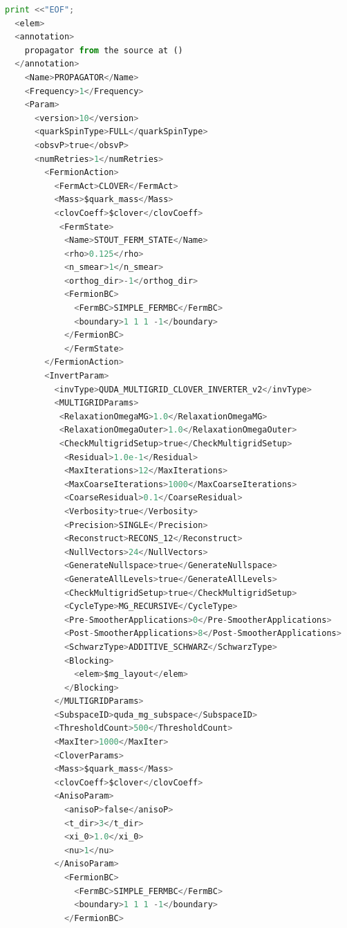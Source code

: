 \documentclass{article}
\begin{document}
\begin{lstlisting}[language=Python]
  print <<"EOF";
  <elem>
  <annotation>
    propagator from the source at ()
  </annotation>      
    <Name>PROPAGATOR</Name>
    <Frequency>1</Frequency>
    <Param>
      <version>10</version>
      <quarkSpinType>FULL</quarkSpinType>
      <obsvP>true</obsvP>
      <numRetries>1</numRetries>
        <FermionAction>
          <FermAct>CLOVER</FermAct>
          <Mass>$quark_mass</Mass>
          <clovCoeff>$clover</clovCoeff>
           <FermState>
            <Name>STOUT_FERM_STATE</Name>
            <rho>0.125</rho>
            <n_smear>1</n_smear>
            <orthog_dir>-1</orthog_dir>
            <FermionBC>
              <FermBC>SIMPLE_FERMBC</FermBC>
              <boundary>1 1 1 -1</boundary>
            </FermionBC>
            </FermState>
        </FermionAction>
        <InvertParam>
          <invType>QUDA_MULTIGRID_CLOVER_INVERTER_v2</invType>
          <MULTIGRIDParams>
           <RelaxationOmegaMG>1.0</RelaxationOmegaMG>
           <RelaxationOmegaOuter>1.0</RelaxationOmegaOuter>
           <CheckMultigridSetup>true</CheckMultigridSetup>
            <Residual>1.0e-1</Residual>
            <MaxIterations>12</MaxIterations>
            <MaxCoarseIterations>1000</MaxCoarseIterations>
            <CoarseResidual>0.1</CoarseResidual>                          
            <Verbosity>true</Verbosity>
            <Precision>SINGLE</Precision>
            <Reconstruct>RECONS_12</Reconstruct>
            <NullVectors>24</NullVectors>
            <GenerateNullspace>true</GenerateNullspace>
            <GenerateAllLevels>true</GenerateAllLevels>
            <CheckMultigridSetup>true</CheckMultigridSetup>
            <CycleType>MG_RECURSIVE</CycleType>
            <Pre-SmootherApplications>0</Pre-SmootherApplications>
            <Post-SmootherApplications>8</Post-SmootherApplications>
            <SchwarzType>ADDITIVE_SCHWARZ</SchwarzType>
            <Blocking>
              <elem>$mg_layout</elem>
            </Blocking>
          </MULTIGRIDParams>
          <SubspaceID>quda_mg_subspace</SubspaceID>
          <ThresholdCount>500</ThresholdCount>
          <MaxIter>1000</MaxIter>
          <CloverParams>
          <Mass>$quark_mass</Mass>
          <clovCoeff>$clover</clovCoeff>
          <AnisoParam>
            <anisoP>false</anisoP>
            <t_dir>3</t_dir>
            <xi_0>1.0</xi_0>
            <nu>1</nu>
          </AnisoParam>
            <FermionBC>
              <FermBC>SIMPLE_FERMBC</FermBC>
              <boundary>1 1 1 -1</boundary>
            </FermionBC>

\end{lstlisting}
\end{document}
